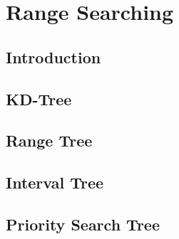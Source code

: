 \section{Range Searching}
\subsection{Introduction}

\subsection{KD-Tree}

\subsection{Range Tree}

\subsection{Interval Tree}

\subsection{Priority Search Tree}